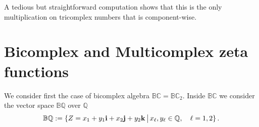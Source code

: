 \documentclass[reqno]{amsart}
\theoremstyle{plain}
\theoremstyle{definition}
\theoremstyle{remark}
\numberwithin{equation}{section}
\begin{document}
A tedious but straightforward computation shows that this is the only
multiplication on tricomplex numbers that is component-wise.

\bigskip

\section{Bicomplex and Multicomplex zeta functions}
\label{sec:bicomplex_zeta}

We consider first the case of bicomplex algebra ${{\mathbb B}{\mathbb C}}={{\mathbb B}{\mathbb C}}_2$. 
Inside ${{\mathbb B}{\mathbb C}}$ we consider the vector space ${{\mathbb B}{\mathbb Q}}$ over ${{\mathbb Q}}$ 
\begin{equation}
  \label{eq:BQ}
  {{\mathbb B}{\mathbb Q}} := \{ Z = x_1 +y_1{{\bf i}} + x_2{{\bf j}} + y_2{{\bf k}}\,\big|\, x_\ell,y_\ell\in{{\mathbb Q}}, \quad\ell=1,2\}\,.
\end{equation}
\end{document}
